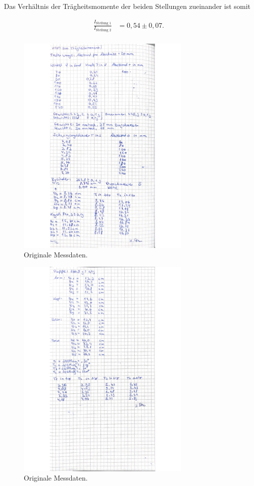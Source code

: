 Das Verhältnis der Trägheitsmomente der beiden Stellungen zueinander ist somit

\begin{align*}
  \frac{I_{\text{Stellung 1}}}{I_{\text{Stellung 2}}} &= 0,54\pm 0,07.  \\
\end{align*}


\newpage

\begin{figure}[H]
  \centering
  \includegraphics[width=0.75\textwidth]{Bilder/daten1.jpg}
  \caption{Originale Messdaten.}
  \label{fig:daten1}
\end{figure}

\begin{figure}[H]
  \centering
  \includegraphics[width=0.75\textwidth]{Bilder/daten2.jpg}
  \caption{Originale Messdaten.}
  \label{fig:daten2}
\end{figure}
